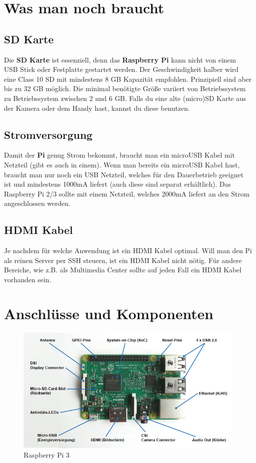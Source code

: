 \documentclass[12pt,a4paper]{article}
\newcommand{\rp}{\textbf{Raspberry Pi}\xspace}
\begin{document}
\section{Was man noch braucht}
\label{sec:acc}

\subsection{SD Karte}

Die \textbf{SD Karte} ist essenziell, denn das \rp kann nicht von einem USB Stick oder Festplatte gestartet werden. Der Geschwindigkeit halber wird eine Class 10 SD mit mindestens 8 GB Kapazität empfohlen. Prinzipiell sind aber bis zu 32 GB möglich. Die minimal benötigte Größe variiert von Betriebssystem zu Betriebssystem zwischen 2 und 6 GB. Falls du eine alte (micro)SD Karte aus der Kamera oder dem Handy hast, kannst du diese benutzen.

\subsection{Stromversorgung}

Damit der \textbf{Pi} genug Strom bekommt, braucht man ein microUSB Kabel mit Netzteil (gibt es auch in einem). Wenn man bereits ein microUSB Kabel hast, braucht man nur noch ein USB Netzteil, welches für den Dauerbetrieb geeignet ist und mindestens 1000mA liefert (auch diese sind separat erhältlich). Das Raspberry Pi 2/3 sollte mit einem Netzteil, welches 2000mA liefert an den Strom angeschlossen werden.

\subsection{HDMI Kabel}

Je nachdem für welche Anwendung ist ein HDMI Kabel optimal. Will man den Pi als reinen Server per SSH steuern, ist ein HDMI Kabel nicht nötig. Für andere Bereiche, wie z.B. als Multimedia Center sollte auf jeden Fall ein HDMI Kabel vorhanden sein.

\clearpage
\appendix
\makeatletter
\def\@seccntformat#1{Anhang~\csname the#1\endcsname:\quad}
\makeatother

\section{Anschlüsse und Komponenten}
\label{apx:comp}

\begin{figure}[h]
\centering
\includegraphics[scale=0.7]{raspberry_loesung}
\caption{Raspberry Pi 3}
\label{fig:rp_ls}
\end{figure}
\end{document}
